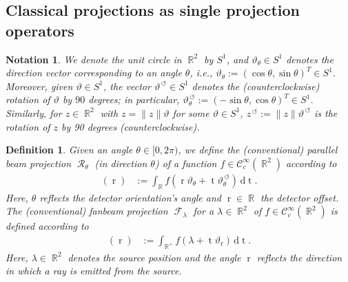 \documentclass[12pt]{article}
\newtheorem{definition}[theorem]{Definition}
\newtheorem{notation}[theorem]{Notation}
\DeclareMathOperator{\projvariable}{i}
\DeclareMathOperator{\projgroundset}{\Lambda}
\DeclareMathOperator{\RR}{{\mathbb{R}}}
\newcommand{\dd}[1]{\,\mathrm{d}{#1}}
\DeclareMathOperator{\Radon}{\mathcal{R}}
\DeclareMathOperator{\Fanbeam}{\mathcal{F}}
\DeclareMathOperator{\rotated}{\,\circlearrowleft}
\DeclareMathOperator{\tvariable}{t}
\DeclareMathOperator{\rayvariable}{r}
\begin{document}
\subsection{Classical projections as single projection operators}
\label{section_known_conditions_summary}
\begin{notation}
We denote the unit circle in $\RR^2$ by $S^1$, and $\vartheta_\theta\in S^1$ denotes the direction vector corresponding to an angle $\theta$, i.e., $\vartheta_{\theta}:=(\cos\theta,\sin\theta)^T\in S^1$.
Moreover, given $\vartheta\in S^1$, the vector $\vartheta^{\rotated}\in S^1$ denotes the (counterclockwise) rotation of $\vartheta$ by $90$ degrees; in particular, $\vartheta^{\rotated}_\theta:=(-\sin\theta,\cos\theta)^T\in S^1$. Similarly, for $z\in \RR^2$ with $z = \|z\|\vartheta$ for some $\vartheta\in S^1$, $z^{\rotated}:=\|z\| \vartheta^{\rotated}$ is the rotation of $z$ by 90 degrees (counterclockwise).
\end{notation}
\begin{definition}
Given an angle $\theta\in [0,2\pi)$, we define the (conventional) parallel beam projection $\Radon_\theta$ (in direction $\theta$)  of a function $f\in \mathcal{C}^\infty_c(\RR^2)$ according to
\begin{align} 
[\Radon_\theta f ](\rayvariable) &:=\int_{\RR} f(\rayvariable \vartheta_{\theta}+\tvariable \vartheta^{\rotated}_{\theta}) \dd \tvariable.
\end{align}
Here, $\theta$ reflects the detector orientation's angle and $\rayvariable\in \RR$ the detector offset.
The (conventional) fanbeam projection $\Fanbeam_\lambda$ for a $\lambda\in \RR^2$ of $f\in \mathcal{C}^\infty_c(\RR^2)$ is defined according to
\begin{align}
[\Fanbeam_\lambda f](\rayvariable)&:=\int_{\RR^+} f(\lambda +\tvariable \vartheta_{\rayvariable}) \dd \tvariable.
\end{align}
Here, $\lambda\in \RR^2$ denotes the source position and the angle $\rayvariable$ reflects the direction in which a ray is emitted from the source.
\end{definition}

\end{document}
